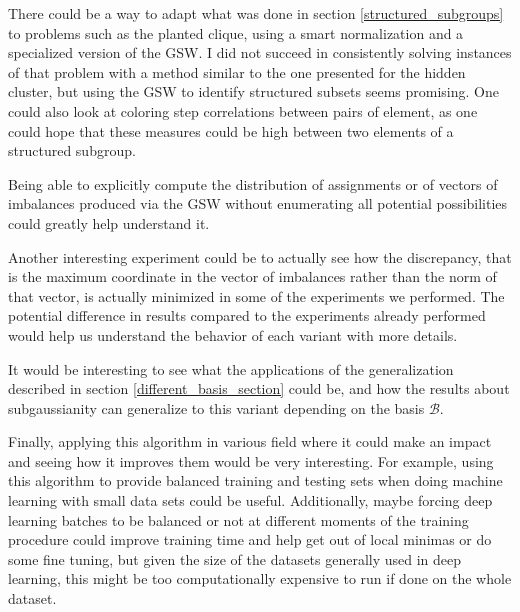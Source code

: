 \documentclass[12pt]{article}
\begin{document}
There could be a way to adapt what was done in section \ref{structured_subgroups} to problems such as the planted clique, using a smart normalization and a specialized version of the GSW. I did not succeed in consistently solving instances of that problem with a method similar to the one presented for the hidden cluster, but using the GSW to identify structured subsets seems promising. One could also look at coloring step correlations between pairs of element, as one could hope that these measures could be high between two elements of a structured subgroup.

Being able to explicitly compute the distribution of assignments or of vectors of imbalances produced via the GSW without enumerating all potential possibilities could greatly help understand it.

Another interesting experiment could be to actually see how the discrepancy, that is the maximum coordinate in the vector of imbalances rather than the norm of that vector, is actually minimized in some of the experiments we performed. The potential difference in results compared to the experiments already performed would help us understand the behavior of each variant with more details.

It would be interesting to see what the applications of the generalization described in section \ref{different_basis_section} could be, and how the results about subgaussianity can generalize to this variant depending on the basis $\mathcal{B}$.

Finally, applying this algorithm in various field where it could make an impact and seeing how it improves them would be very interesting. For example, using this algorithm to provide balanced training and testing sets when doing machine learning with small data sets could be useful. Additionally, maybe forcing deep learning batches to be balanced or not at different moments of the training procedure could improve training time and help get out of local minimas or do some fine tuning, but given the size of the datasets generally used in deep learning, this might be too computationally expensive to run if done on the whole dataset.
\newpage


\newpage
\nocite{*}



\end{document}
